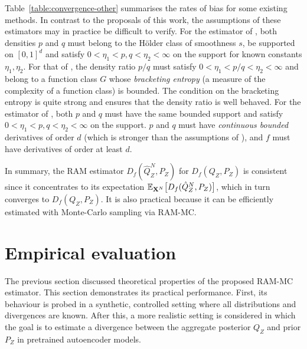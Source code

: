 Table~\ref{table:convergence-other} summarises the rates of bias for some existing methods.
In contrast to the proposals of this work, the assumptions of these estimators may in practice be difficult to verify.
For the estimator of \cite{krishnamurthy14icml}, both densities $p$ and $q$ must belong to the H\"older class of smoothness $s$, be supported on $[0,1]^d$ and satisfy $0<\eta_1 < p, q < \eta_2<\infty$ on the support for known constants $\eta_1, \eta_2$.
For that of \cite{nguyen10ratio}, the density ratio $p/q$ must satisfy $0<\eta_1 < p/q < \eta_2<\infty$ and belong to a function class $G$ whose \emph{bracketing entropy} (a measure of the complexity of a function class) is bounded. The condition on the bracketing entropy is quite strong and ensures that the density ratio is well behaved.
For the estimator of \cite{moon14ensemble}, both $p$ and $q$ must have the same bounded support and satisfy $0<\eta_1 < p, q < \eta_2<\infty$ on the support. $p$ and $q$ must have \emph{continuous bounded} derivatives of order $d$ (which is stronger than the assumptions of \cite{krishnamurthy14icml}), and $f$ must have derivatives of order at least $d$.

In summary, the RAM estimator $D_f(\hat{Q}_Z^N , P_Z)$ for $D_f(Q_Z , P_Z)$ is consistent since it concentrates to its expectation $\mathbb{E}_{\mathbf{X}^N}\bigl[D_f(\hat{Q}_Z^N , P_Z)\bigr]$, which in turn converges to $D_f(Q_Z , P_Z)$.
It is also practical because it can be efficiently estimated with Monte-Carlo sampling via RAM-MC.

\section{Empirical evaluation}\label{sec:experiments}

The previous section discussed theoretical properties of the proposed RAM-MC estimator.
This section demonstrates its practical performance.
First, its behaviour is probed in a synthetic, controlled setting where all distributions and divergences are known.
After this, a more realistic setting is considered in which the goal is to estimate a divergence between the aggregate posterior $Q_Z$ and prior $P_Z$ in pretrained autoencoder models. 


